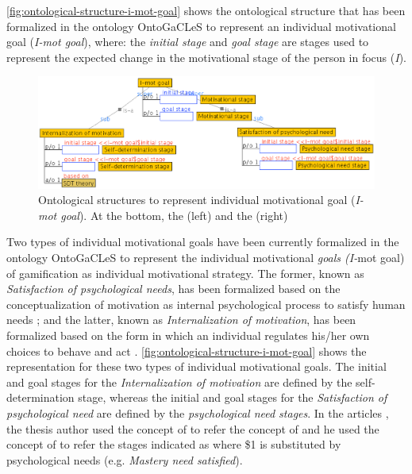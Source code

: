 \autoref{fig:ontological-structure-i-mot-goal} shows the ontological structure that has been formalized in the ontology OntoGaCLeS to represent an individual motivational goal (\emph{I-mot goal}), where:
the \emph{initial stage} and \emph{goal stage} are stages used to represent the expected change in the motivational stage of the person in focus (\emph{I}).

\begin{figure}[!htbp]
 \caption[Ontological structures to represent individual motivational goal (I-mot goal)]{Ontological structures to represent individual motivational goal (\emph{I-mot goal}). At the bottom, the  (left) and the  (right)}
 \label{fig:ontological-structure-i-mot-goal}
 \centering
 \includegraphics[width=1\textwidth]{images/chap-ontogacles1/ontological-structure-i-mot-goal.png}
 \fautor
\end{figure}

Two types of individual motivational goals have been currently formalized in the ontology OntoGaCLeS to represent the individual motivational\emph{ goals (I-}mot goal) of gamification as individual motivational strategy.
The former, known as \emph{Satisfaction of psychological needs}, has been formalized based on the conceptualization of motivation as internal psychological process to satisfy human needs \cite{PritchardAshwood2008}; and
the latter, known as \emph{Internalization of motivation}, has been formalized based on the form in which an individual regulates his/her own choices to behave and act \cite{DeciRyan2010}.
\autoref{fig:ontological-structure-i-mot-goal} shows the representation for these two types of individual motivational goals.
The initial and goal stages for the \emph{Internalization of motivation} are defined by the self-determination stage, whereas the initial and goal stages for the \emph{Satisfaction of psychological need} are defined by the \emph{psychological need stages}.
In the articles  \cite{ChallcoMoreiraBittencourtMizoguchiIsotani2015, ChallcoMoreiraMizoguchiIsotani2014, ChallcoMoreiraMizoguchiIsotani2014a}, the thesis author used the concept of  to refer the concept of  and he used the concept of  to refer the stages indicated as  where \$1 is substituted by psychological needs (e.g. \emph{Mastery need satisfied}).

